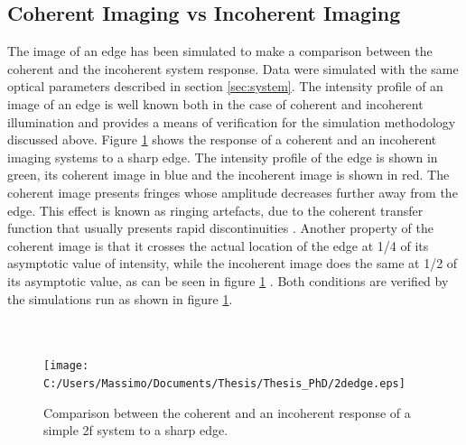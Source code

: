 \subsection{Coherent Imaging vs Incoherent Imaging}
The image of an edge has been simulated to make a comparison between the coherent and the incoherent system response. Data were simulated with the same optical parameters described in section \ref{sec:system}. The intensity profile of an image of an edge is well known both in the case of coherent and incoherent illumination and provides a means of verification for the simulation methodology discussed above. Figure \ref{fig:coherenceprofile} shows the response of a coherent and an incoherent imaging systems to a sharp edge. The intensity profile of the edge is shown in green, its coherent image in blue and the incoherent image is shown in red. The coherent image presents fringes whose amplitude decreases further away from the edge. This effect is known as ringing artefacts, due to the coherent transfer function that usually presents rapid discontinuities \cite{goodman2005introduction}. Another property of the coherent image is that it crosses the actual location of the edge at 1/4 of its asymptotic value of intensity, while the incoherent image does the same at 1/2 of its asymptotic value, as can be seen in figure \ref{fig:coherenceprofile} \cite{goodman2005introduction}. Both conditions are verified by the simulations run as shown in figure \ref{fig:coherenceprofile}. \\
\\
\\
\begin{figure}[H]
	\centering
	\texttt{[image: C:/Users/Massimo/Documents/Thesis/Thesis\_PhD/2dedge.eps]}
	\caption{\label{fig:coherenceprofile}Comparison between the coherent and an incoherent response of a simple 2f system to a sharp edge.}
\end{figure}
